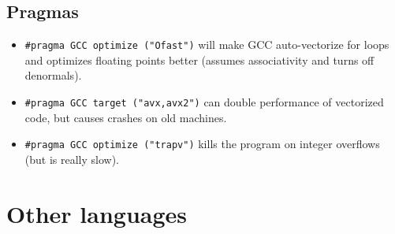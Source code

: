 	\subsection{Pragmas}
		\begin{itemize}
			\item \lstinline{#pragma GCC optimize ("Ofast")} will make GCC auto-vectorize for loops and optimizes floating points better (assumes associativity and turns off denormals).
			\item \lstinline{#pragma GCC target ("avx,avx2")} can double performance of vectorized code, but causes crashes on old machines.
			\item \lstinline{#pragma GCC optimize ("trapv")} kills the program on integer overflows (but is really slow).
		\end{itemize}

\section{Other languages}
